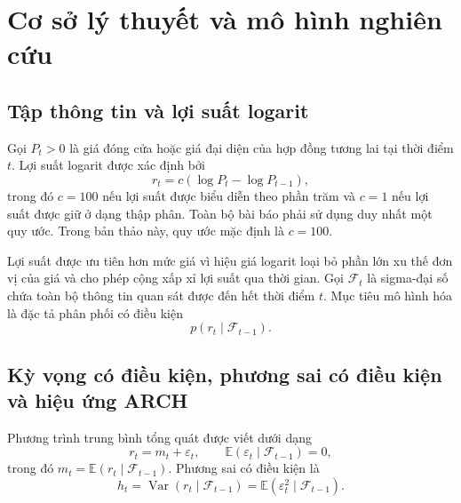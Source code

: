 \documentclass[12pt,a4paper]{article}
\numberwithin{equation}{section}
\newcommand{\Info}{\mathcal{F}}
\newcommand{\E}{\mathbb{E}}
\newcommand{\Var}{\operatorname{Var}}
\begin{document}
\section{Cơ sở lý thuyết và mô hình nghiên cứu}\label{sec:ly-thuyet}

\subsection{Tập thông tin và lợi suất logarit}\label{subsec:return}

Gọi $P_t>0$ là giá đóng cửa hoặc giá đại diện của hợp đồng tương lai tại thời điểm $t$. Lợi suất logarit được xác định bởi
\begin{equation}
  r_t = c\left(\log P_t-\log P_{t-1}\right),
  \label{eq:log-return}
\end{equation}
trong đó $c=100$ nếu lợi suất được biểu diễn theo phần trăm và $c=1$ nếu lợi suất được giữ ở dạng thập phân. Toàn bộ bài báo phải sử dụng duy nhất một quy ước. Trong bản thảo này, quy ước mặc định là $c=100$.

Lợi suất được ưu tiên hơn mức giá vì hiệu giá logarit loại bỏ phần lớn xu thế đơn vị của giá và cho phép cộng xấp xỉ lợi suất qua thời gian. Gọi $\Info_t$ là sigma-đại số chứa toàn bộ thông tin quan sát được đến hết thời điểm $t$. Mục tiêu mô hình hóa là đặc tả phân phối có điều kiện
\begin{equation}
  p(r_t\mid\Info_{t-1}).
  \label{eq:conditional-density}
\end{equation}

\subsection{Kỳ vọng có điều kiện, phương sai có điều kiện và hiệu ứng ARCH}\label{subsec:conditional-moments}

Phương trình trung bình tổng quát được viết dưới dạng
\begin{equation}
  r_t = m_t + \varepsilon_t,
  \qquad
  \E(\varepsilon_t\mid\Info_{t-1})=0,
  \label{eq:mean-general}
\end{equation}
trong đó $m_t=\E(r_t\mid\Info_{t-1})$. Phương sai có điều kiện là
\begin{equation}
  h_t = \Var(r_t\mid\Info_{t-1})
      = \E(\varepsilon_t^2\mid\Info_{t-1}).
  \label{eq:conditional-variance}
\end{equation}
\end{document}
